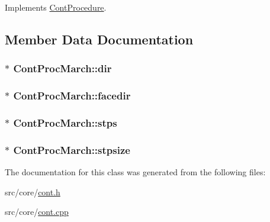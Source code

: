 Implements \hyperlink{a00067_a7f7adefe250a00b3778669ef649f03ac}{Cont\-Procedure}.



\subsection{Member Data Documentation}
\hypertarget{a00077_a02a9dde1ad80637c51c84062520de523}{
\subsubsection[{dir}]{ $\ast$ Cont\-Proc\-March\-::dir\hspace{0.3cm}{\ttfamily [private]}}}\label{a00077_a02a9dde1ad80637c51c84062520de523}
\hypertarget{a00077_acf1dac23572c0dd7eeb2ac7446aeb5b0}{
\subsubsection[{facedir}]{ $\ast$ Cont\-Proc\-March\-::facedir\hspace{0.3cm}{\ttfamily [private]}}}\label{a00077_acf1dac23572c0dd7eeb2ac7446aeb5b0}
\hypertarget{a00077_a4c65cf252b4efcf178a0cfd89c754efa}{
\subsubsection[{stps}]{ $\ast$ Cont\-Proc\-March\-::stps\hspace{0.3cm}{\ttfamily [private]}}}\label{a00077_a4c65cf252b4efcf178a0cfd89c754efa}
\hypertarget{a00077_a513de77437d22245d06148c952ee4aea}{
\subsubsection[{stpsize}]{$\ast$ Cont\-Proc\-March\-::stpsize\hspace{0.3cm}{\ttfamily [private]}}}\label{a00077_a513de77437d22245d06148c952ee4aea}


The documentation for this class was generated from the following files\-:\begin{DoxyCompactItemize}
\item 
src/core/\hyperlink{a00218}{cont.\-h}\item 
src/core/\hyperlink{a00217}{cont.\-cpp}\end{DoxyCompactItemize}
